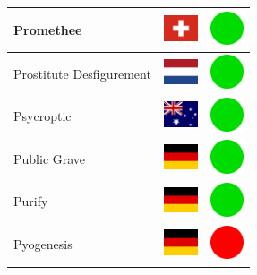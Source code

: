 \documentclass[12pt, a4paper, twoside]{report}
\begin{document}
\begin{center}
\begin{longtable}{|p{5cm}|p{2cm}|p{2cm}|}
Promethee & \includegraphics[width=1cm]{4x3/ch} & \includegraphics[width=1cm]{likes/y} \\ \hline
Prostitute Desfigurement & \includegraphics[width=1cm]{4x3/nl} & \includegraphics[width=1cm]{likes/y} \\ \hline
Psycroptic & \includegraphics[width=1cm]{4x3/au} & \includegraphics[width=1cm]{likes/y} \\ \hline
Public Grave & \includegraphics[width=1cm]{4x3/de} & \includegraphics[width=1cm]{likes/y} \\ \hline
Purify & \includegraphics[width=1cm]{4x3/de} & \includegraphics[width=1cm]{likes/y} \\ \hline
Pyogenesis & \includegraphics[width=1cm]{4x3/de} & \includegraphics[width=1cm]{likes/n} \\ \hline

\end{longtable}
\end{center}
\end{document}
